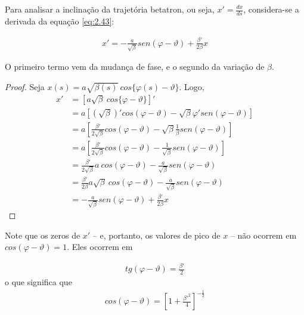 Para analisar a inclinação da trajetória betatron, ou seja, $x'=\frac{dx}{ds}$, considera-se a derivada da equação \eqref{eq:2.43}:
	
\begin{align}
	x' = - \frac{a}{\sqrt{\beta}}sen(\varphi-\vartheta)+\frac{\beta'}{2\beta}x\label{eq:2.52}
\end{align}
	
O primeiro termo vem da mudança de fase, e o segundo da variação de $\beta$.
	
\begin{proof}
	Seja $x(s) = a\sqrt{\beta(s)}\ cos\{\varphi(s)-\vartheta\}$. Logo, 
	\begin{align*}
      x' &= [a\sqrt{\beta}\ cos\{\varphi-\vartheta\}]'\\
         &= a[(\sqrt{\beta})'cos(\varphi-\vartheta)-\sqrt{\beta}\varphi'sen(\varphi-\vartheta)]\\
      	 &= a\left[\frac{\beta'}{2\sqrt{\beta}}cos(\varphi-\vartheta)-\sqrt{\beta}\frac{1}{\beta}sen(\varphi-\vartheta)\right]\\
      	 &= a\left[\frac{\beta'}{2\sqrt{\beta}}cos(\varphi-\vartheta)-\frac{1}{\sqrt{\beta}}sen(\varphi-\vartheta)\right]\\
      	 &= \frac{\beta'}{2\sqrt{\beta}}a\ cos(\varphi-\vartheta)-\frac{a}{\sqrt{\beta}}sen(\varphi-\vartheta)\\
      	 &= \frac{\beta'}{2\beta}a\sqrt{\beta}\ cos(\varphi-\vartheta)-\frac{a}{\sqrt{\beta}}sen(\varphi-\vartheta)\\
      	 &= -\frac{a}{\sqrt{\beta}}sen(\varphi-\vartheta)+\frac{\beta'}{2\beta}x
	\end{align*}
\end{proof}
	
Note que os zeros de $x'$ -- e, portanto, os valores de pico de $x$ -- não ocorrem em $cos(\varphi-\vartheta)=1$. Eles ocorrem em
	
\begin{align}
	tg(\varphi-\vartheta) = \frac{\beta'}{2}
\end{align}
o que significa que
\begin{align}
	cos(\varphi-\vartheta) = \left[1+\frac{\beta'^2}{4}\right]^{-\frac{1}{2}}
\end{align}
	
